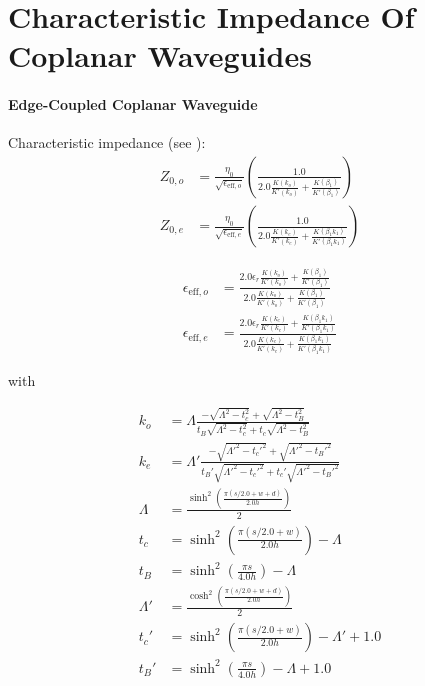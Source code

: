 \section{Characteristic Impedance Of Coplanar Waveguides} \label{app:waveguides}
\paragraph{Edge-Coupled Coplanar Waveguide}

Characteristic impedance (see \cite[~p197-198]{wadell}): 
\begin{align}
	Z_{0,o} & = \frac{\eta_0}{\sqrt{\epsilon_{\text{eff},o}}} \left( \frac{1.0}{2.0 \frac{K(k_o)}{K'(k_o)} + \frac{K(\beta_1)}{K'(\beta_1)}}\right)         \\
	Z_{0,e} & = \frac{\eta_0}{\sqrt{\epsilon_{\text{eff},e}}} \left( \frac{1.0}{2.0 \frac{K(k_e)}{K'(k_e)} + \frac{K(\beta_1 k_1)}{K'(\beta_1 k_1)}}\right)
\end{align}    

\begin{align}
	\epsilon_{\text{eff},o} & = \frac{2.0 \epsilon_r \frac{K(k_o)}{K'(k_o)} + \frac{K(\beta_1)}{K'(\beta_1)}}{2.0 \frac{K(k_o)}{K'(k_o)} + \frac{K(\beta_1)}{K'(\beta_1)}}                 \\
	\epsilon_{\text{eff},e} & = \frac{2.0 \epsilon_r \frac{K(k_e)}{K'(k_e)} + \frac{K(\beta_1 k_1)}{K'(\beta_1 k_1)}}{2.0 \frac{K(k_e)}{K'(k_e)} + \frac{K(\beta_1 k_1)}{K'(\beta_1 k_1)}}
\end{align}

with

\begin{align}
	k_o      & = \Lambda \frac{-\sqrt{\Lambda^2 - t_c^2} + \sqrt{\Lambda^2 - t_B^2}}{t_B\sqrt{\Lambda^2 - t_c^2} + t_c \sqrt{\Lambda^2 - t_B^2}}            \\
	k_e      & = \Lambda' \frac{-\sqrt{\Lambda'^2 - t_c'^2} + \sqrt{\Lambda'^2 - t_B'^2}}{t_B'\sqrt{\Lambda'^2 - t_c'^2} + t_c' \sqrt{\Lambda'^2 - t_B'^2}} \\
	\Lambda  & = \frac{\sinh^2 \left( \frac{\pi (s/2.0 + w + d)}{2.0 h} \right) }{2}                                                                        \\
	t_c      & = \sinh^2 \left( \frac{\pi (s/2.0 + w)}{2.0 h} \right) - \Lambda                                                                             \\
	t_B      & = \sinh^2 \left( \frac{\pi s}{4.0 h} \right) - \Lambda                                                                                       \\
	\Lambda' & = \frac{\cosh^2 \left( \frac{\pi (s/2.0 + w + d)}{2.0 h} \right) }{2}                                                                        \\
	t_c'     & = \sinh^2 \left( \frac{\pi (s/2.0 + w)}{2.0 h} \right) - \Lambda' + 1.0                                                                      \\
	t_B'     & = \sinh^2 \left( \frac{\pi s}{4.0 h} \right) - \Lambda + 1.0
\end{align}

